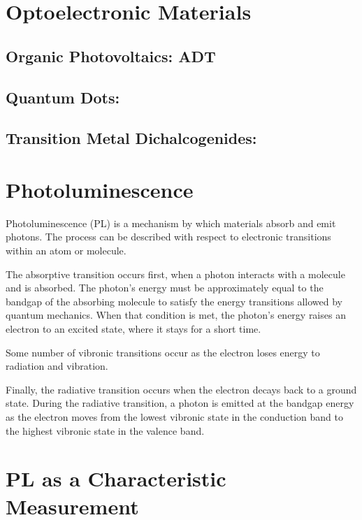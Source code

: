 \section{Optoelectronic Materials}
\subsection{Organic Photovoltaics: ADT}
\subsection{Quantum Dots: }
\subsection{Transition Metal Dichalcogenides: }

\section{Photoluminescence}
Photoluminescence (PL) is a mechanism by which materials absorb and emit photons. The process can be described with respect to electronic transitions within an atom or molecule.

The absorptive transition occurs first, when a photon interacts with a molecule and is absorbed. The photon's energy must be approximately equal to the bandgap of the absorbing molecule to satisfy the energy transitions allowed by quantum mechanics. When that condition is met, the photon's energy raises an electron to an excited state, where it stays for a short time.

Some number of vibronic transitions occur as the electron loses energy to radiation and vibration. 

Finally, the radiative transition occurs when the electron decays back to a ground state. During the radiative transition, a photon is emitted at the bandgap energy as the electron moves from the lowest vibronic state in the conduction band to the highest vibronic state in the valence band. 

\section{PL as a Characteristic Measurement}
